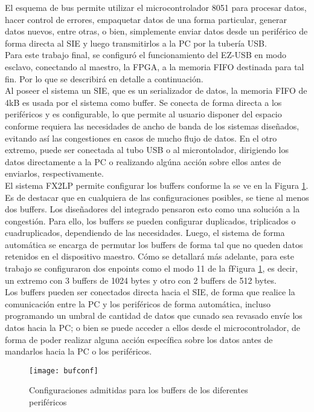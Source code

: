 	El esquema de bus permite utilizar el microcontrolador 8051 para procesar datos, hacer control de errores, empaquetar datos de una forma particular, generar datos nuevos, entre otras, o bien, simplemente enviar datos desde un periférico de forma directa al SIE y luego transmitirlos a la PC por la tubería USB.\\
	
	Para este trabajo final, se configuró el funcionamiento del EZ-USB en modo esclavo, conectando al maestro, la FPGA, a la memoria FIFO destinada para tal fin. Por lo que se describirá en detalle a continuación.\\
	
	Al poseer el sistema un SIE, que es un serializador de datos, la memoria FIFO de 4kB es usada por el sistema como buffer. Se conecta de forma directa a los periféricos y es configurable, lo que permite al usuario disponer del espacio conforme requiera las necesidades de ancho de banda de los sistemas diseñados, evitando así las congestiones en casos de mucho flujo de datos. En el otro extremo, puede ser conectada al tubo USB o al microntolador, dirigiendo los datos directamente a la PC o realizando algúna acción sobre ellos antes de enviarlos, respectivamente.\\
	
	El sistema FX2LP permite configurar los buffers conforme la se ve en la Figura \ref{epconfigs}. Es de destacar que en cualquiera de las configuraciones posibles, se tiene al menos dos buffers. Los diseñadores del integrado pensaron esto como una solución a la congestión. Para ello, los buffers se pueden configurar duplicados, triplicados o cuadruplicados, dependiendo de las necesidades. Luego, el sistema de forma automática se encarga de permutar los buffers de forma tal que no queden datos retenidos en el dispositivo maestro. Cómo se detallará más adelante, para este trabajo se configuraron dos enpoints como el modo 11 de la fFigura \ref{epconfigs}, es decir, un extremo con 3 buffers de 1024 bytes y otro con 2 buffers de 512 bytes.\\
	
	Los buffers pueden ser conectados directa hacia el SIE, de forma que realice la comunicación entre la PC y los periféricos de forma automática, incluso programando un umbral de cantidad de datos que cunado sea revasado envíe los datos hacia la PC; o bien se puede acceder a ellos desde el microcontrolador, de forma de poder realizar alguna acción específica sobre los datos antes de mandarlos hacia la PC o los periféricos.\\
		
	\begin{figure}[h]
		\centering
		\texttt{[image: bufconf]}
		\caption{Configuraciones admitidas para los buffers de los diferentes periféricos}
		\label{epconfigs}
	\end{figure}